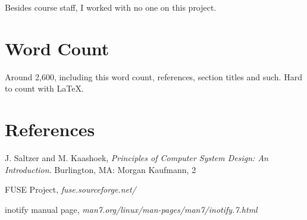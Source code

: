 \documentclass[a4paper]{report}
\begin{document}
Besides course staff, I worked with no one on this project.

\section{Word Count}

Around 2,600, including this word count, references, section titles and such. Hard to count with \LaTeX.

\section{References}

J. Saltzer  and  M. Kaashoek,  \textit{Principles  of  Computer  System  Design:  An  Introduction}.
Burlington,  MA:  Morgan  Kaufmann,  2

FUSE Project, \textit{fuse.sourceforge.net/}

inotify manual page, \textit{man7.org/linux/man-pages/man7/inotify.7.html}
\end{document}
